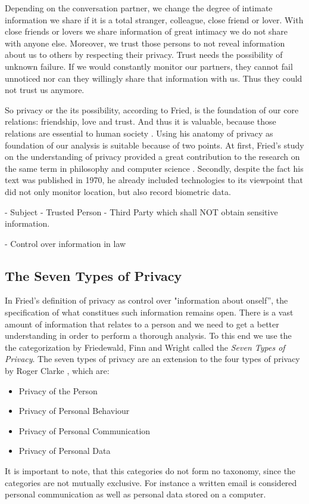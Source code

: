 Depending on the conversation partner, we change the degree of intimate information we share if it is a total stranger, colleague, close friend or lover.
With close friends or lovers we share information of great intimacy we do not share with anyone else.
Moreover, we trust those persons to not reveal information about us to others by respecting their privacy.
Trust needs the possibility of unknown failure.
If we would constantly monitor our partners, they cannot fail unnoticed nor can they willingly share that information with us.
Thus they could not trust us anymore. \cite{CFried:Privacy}

So privacy or the its possibility, according to Fried, is the foundation of our core relations: friendship, love and trust.
And thus it is valuable, because those relations are essential to human society \cite{CFried:Privacy}.
Using his anatomy of privacy as foundation of our analysis is suitable because of two points.
At first, Fried's study on the understanding of privacy provided a great contribution to the research on the same term in philosophy \cite{sep-privacy} and computer science \cite{SociotechnicalArchitectureForOnlinePrivacy}.
Secondly, despite the fact his text was published in 1970, he already included technologies to its viewpoint that did not only monitor location, but also record biometric data.

- Subject
- Trusted Person
- Third Party which shall NOT obtain sensitive information.

- Control over information in law

\subsection{The Seven Types of Privacy}

In Fried's definition of privacy as control over "information about onself'', the specification of what constitues such information remains open.
There is a vast amount of information that relates to a person and we need to get a better understanding in order to perform a thorough analysis.
To this end we use the the categorization by Friedewald, Finn and Wright \cite{7ToP} called the \textit{Seven Types of Privacy}.
The seven types of privacy are an extension to the four types of privacy by Roger Clarke \cite{RClarke:4ToP}, which are:
\begin{itemize}
\item Privacy of the Person
\item Privacy of Personal Behaviour
\item Privacy of Personal Communication
\item Privacy of Personal Data
\end{itemize}
It is important to note, that this categories do not form no taxonomy, since the categories are not mutually exclusive.
For instance a written email is considered personal communication as well as personal data stored on a computer.

